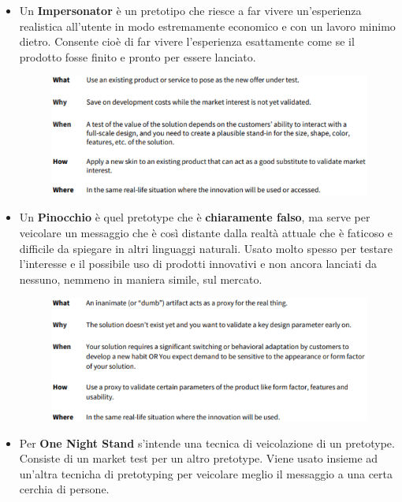 \documentclass[a4paper,11pt,oneside]{book}
\begin{document}
\begin{itemize}
	\item Un \textbf{Impersonator} è un pretotipo che riesce a far vivere un'esperienza realistica all'utente in modo estremamente economico e con un lavoro minimo dietro. Consente cioè di
	      far vivere l'esperienza esattamente come se il prodotto fosse finito e pronto per essere lanciato.

	      \begin{figure}[!h]
		      \centering
		      \includegraphics[scale=0.42]{immagini/Impersonator.png}
	      \end{figure}

	      \pagebreak

	\item Un \textbf{Pinocchio} è quel pretotype che è \textbf{chiaramente falso}, ma serve per veicolare un messaggio che è così distante dalla realtà attuale che è faticoso e difficile da spiegare in altri linguaggi naturali. Usato molto spesso per testare l'interesse e il possibile uso di prodotti innovativi e non ancora lanciati da nessuno, nemmeno in maniera simile, sul mercato.

	      \begin{figure}[!h]
		      \centering
		      \includegraphics[scale=0.5]{immagini/Pinocchio.png}
	      \end{figure}

	\item Per \textbf{One Night Stand} s'intende una tecnica di veicolazione di un pretotype. Consiste di un market test per un altro pretotype.
	      Viene usato insieme ad un'altra tecnicha di pretotyping per veicolare meglio il messaggio a una certa cerchia di persone.


\end{itemize}
\end{document}

